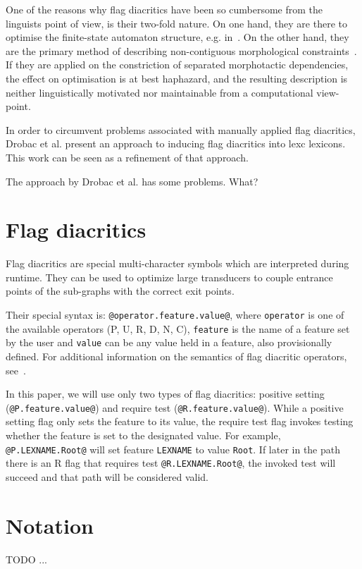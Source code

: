 \documentclass[11pt]{article}
\begin{document}
One of the reasons why flag diacritics have been so cumbersome from
the linguists point of view, is their two-fold nature. On one hand,
they are there to optimise the finite-state automaton structure,
e.g. in~\cite{karttunen2006numbers}. On the other hand, they are the
primary method of describing non-contiguous morphological
constraints~\cite{beesley1998constraining}. If they are applied on the
constriction of separated morphotactic dependencies, the effect on
optimisation is at best haphazard, and the resulting description is
neither linguistically motivated nor maintainable from a computational
view-point.

In order to circumvent problems associated with manually applied flag
diacritics, Drobac et al.  present an approach
to inducing flag diacritics into lexc lexicons. This work can be seen
as a refinement of that approach.

The approach by Drobac et al.  has some
problems. What?

\section{Flag diacritics}
\label{sec:flags}

Flag diacritics are special multi-character symbols which are interpreted during runtime. They can be used to optimize large transducers to couple entrance points of the sub-graphs with the correct exit points.

Their special syntax is: \verb+@operator.feature.value@+, where
\texttt{operator} is one of the available operators (P, U, R, D, N, C), \texttt{feature} is the name of a feature set by the user and \texttt{value} can be any value held in a feature, also provisionally defined. For additional information on the semantics of flag diacritic operators, see~.


In this paper, we will use only two types of flag diacritics: positive
setting (\verb+@P.feature.value@+) and require test
(\verb+@R.feature.value@+). While a positive setting flag only sets the
feature to its value, the require test flag invokes testing whether the
feature is set to the designated value. For example,
\verb+@P.LEXNAME.Root@+ will set feature \texttt{LEXNAME} to value
\texttt{Root}. If later in the path there is an R flag that requires test
\verb+@R.LEXNAME.Root@+, the invoked test will succeed and that path
will be considered valid.


\section{Notation}
\label{sec:notation}
TODO ...
\end{document}
